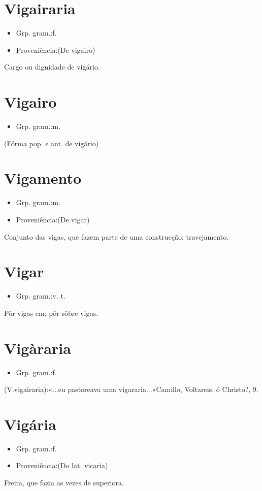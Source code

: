 \documentclass{article}
\begin{document}
\section{Vigairaria}
\begin{itemize}
\item {Grp. gram.:f.}
\end{itemize}
\begin{itemize}
\item {Proveniência:(De \textunderscore vigairo\textunderscore )}
\end{itemize}
Cargo ou dignidade de vigário.
\section{Vigairo}
\begin{itemize}
\item {Grp. gram.:m.}
\end{itemize}
(Fórma pop. e ant. de \textunderscore vigário\textunderscore )
\section{Vigamento}
\begin{itemize}
\item {Grp. gram.:m.}
\end{itemize}
\begin{itemize}
\item {Proveniência:(De \textunderscore vigar\textunderscore )}
\end{itemize}
Conjunto das vigas, que fazem parte de uma construcção; travejamento.
\section{Vigar}
\begin{itemize}
\item {Grp. gram.:v. t.}
\end{itemize}
Pôr vigas em; pôr sôbre vigas.
\section{Vigàraria}
\begin{itemize}
\item {Grp. gram.:f.}
\end{itemize}
(V.vigairaria):«\textunderscore ...eu pastoreava uma vigararia...\textunderscore »Camillo, \textunderscore Voltareis, ó Christo\textunderscore ?, 9.
\section{Vigária}
\begin{itemize}
\item {Grp. gram.:f.}
\end{itemize}
\begin{itemize}
\item {Proveniência:(Do lat. \textunderscore vicaria\textunderscore )}
\end{itemize}
Freira, que fazia as vezes de superiora.
\end{document}
